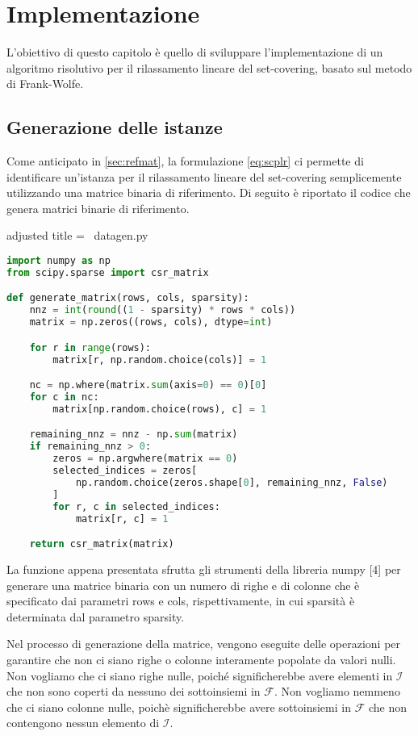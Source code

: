 \chapter{Implementazione}
L'obiettivo di questo capitolo è quello di sviluppare l'implementazione di un algoritmo risolutivo per il rilassamento
lineare del set-covering, basato sul metodo di Frank-Wolfe.

\section{Generazione delle istanze}
Come anticipato in \ref{sec:refmat}, la formulazione \eqref{eq:scplr} ci permette di identificare un'istanza per il
rilassamento lineare del set-covering semplicemente utilizzando una matrice binaria di riferimento. Di seguito è
riportato il codice che genera matrici binarie di riferimento.

\begin{code}{adjusted title = {\pyicon\ datagen.py}}
\begin{lstlisting}[language=python, style = style, caption={Generazione delle matrici binarie di riferimento.}, label =
{lst:genmat}]
import numpy as np
from scipy.sparse import csr_matrix

def generate_matrix(rows, cols, sparsity):
    nnz = int(round((1 - sparsity) * rows * cols))
    matrix = np.zeros((rows, cols), dtype=int)

    for r in range(rows):
        matrix[r, np.random.choice(cols)] = 1

    nc = np.where(matrix.sum(axis=0) == 0)[0]
    for c in nc:
        matrix[np.random.choice(rows), c] = 1

    remaining_nnz = nnz - np.sum(matrix)
    if remaining_nnz > 0:
        zeros = np.argwhere(matrix == 0)
        selected_indices = zeros[
            np.random.choice(zeros.shape[0], remaining_nnz, False)
        ]
        for r, c in selected_indices:
            matrix[r, c] = 1

    return csr_matrix(matrix)
\end{lstlisting}
\end{code}
\noindent
La funzione appena presentata sfrutta gli strumenti della libreria numpy [4] per generare una matrice binaria con un numero
di righe e di colonne che è specificato dai parametri {\jbm rows} e {\jbm cols}, rispettivamente, in cui sparsità è
determinata dal parametro {\jbm sparsity}.

Nel processo di generazione della matrice, vengono
eseguite delle operazioni per garantire che non ci siano righe o colonne interamente popolate da valori nulli. Non
vogliamo che ci siano righe nulle, poiché significherebbe avere elementi in
\(
    \mathcal{I}
\)
che non sono coperti da nessuno dei sottoinsiemi in \( \mathcal{F} \). Non vogliamo nemmeno che ci siano colonne nulle,
poichè significherebbe avere sottoinsiemi in \( \mathcal{F} \) che non contengono nessun elemento di \( \mathcal{I} \).


